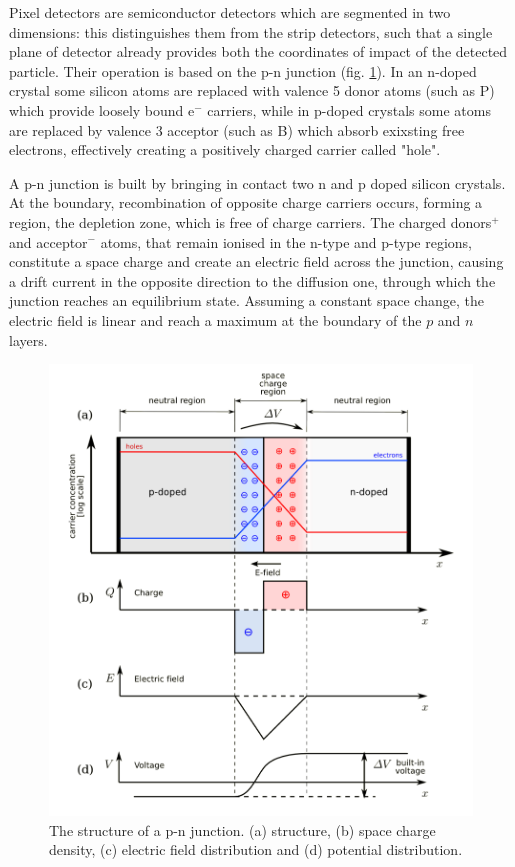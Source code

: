 Pixel detectors are semiconductor detectors which are segmented in two dimensions: this distinguishes them from the strip detectors, such that a single plane of detector already provides both the coordinates of impact of the detected particle. 
Their operation is based on the p-n junction (fig. \ref{fig:junction}). 
In an n-doped crystal some silicon atoms are replaced with valence 5 donor atoms (such as P) which provide loosely bound e$^-$ carriers, while in p-doped crystals some atoms are replaced by valence 3 acceptor (such as B) which absorb exixsting free electrons, effectively creating a positively charged carrier called "hole".

A p-n junction is built by bringing in contact two n and p doped silicon crystals. At the boundary, recombination of opposite charge carriers occurs, forming a region, the depletion zone, which is free of charge carriers. The charged donors$^{+}$ and acceptor$^{-}$ atoms, that remain ionised in the n-type and p-type regions, constitute a space charge and create an electric field across the junction, causing a drift current in the opposite direction to the diffusion one, through which the junction reaches an equilibrium state. Assuming a constant space change, the electric field is linear and reach a maximum at the boundary of the $p$ and $n$ layers.
\begin{figure}[h!]
   \centering
   \includegraphics[width=.69\linewidth]{figures/Pixel_detectors/junction.png}
   \caption{The structure of a p-n junction. (a) structure, (b) space charge density, (c) electric field distribution and (d) potential distribution. }
   \label{fig:junction}
\end{figure}

